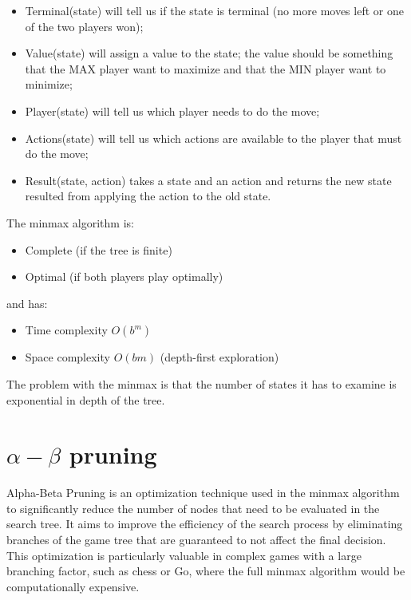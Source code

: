 \documentclass{article}
\begin{document}
\begin{itemize}
    \item Terminal(state) will tell us if the state is terminal (no more moves left or one of the two players won);
    \item Value(state) will assign a value to the state; the value should be something that the MAX player want to maximize and that the MIN player want to minimize;
    \item Player(state) will tell us which player needs to do the move;
    \item Actions(state) will tell us which actions are available to the player that must do the move;
    \item Result(state, action) takes a state and an action and returns the new state resulted from applying the action to the old state. 
\end{itemize}

The minmax algorithm is:

\begin{itemize}
    \item Complete (if the tree is finite)
    \item Optimal (if both players play optimally)
\end{itemize}

and has:

\begin{itemize}
    \item Time complexity $O(b^m)$
    \item Space complexity $O(bm)$ (depth-first exploration)
\end{itemize}

The problem with the minmax is that the number of states it has to examine is exponential in depth of the tree.

\newpage

\section{$\alpha-\beta$ pruning}

Alpha-Beta Pruning is an optimization technique used in the minmax algorithm to significantly reduce the number of nodes that need to be evaluated in the search tree. It aims to improve the efficiency of the search process by eliminating branches of the game tree that are guaranteed to not affect the final decision. This optimization is particularly valuable in complex games with a large branching factor, such as chess or Go, where the full minmax algorithm would be computationally expensive.
\end{document}

